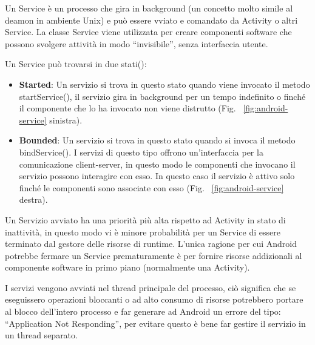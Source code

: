 Un Service è un processo che gira in background (un concetto molto simile al deamon in ambiente Unix) e può essere vviato e comandato da Activity o altri Service. La classe Service viene utilizzata per creare componenti software che possono svolgere attività in modo ``invisibile'', senza interfaccia utente.

Un Service può trovarsi in due stati(\cite{emanuele:android}):

\begin{itemize}
	\item \textbf{Started}: Un servizio si trova in questo stato quando viene invocato il metodo startService(), il servizio gira in background per un tempo indefinito o finché il componente che lo ha invocato non viene distrutto (Fig. ~\ref{fig:android-service} sinistra).
	\item \textbf{Bounded}: Un servizio si trova in questo stato quando si invoca il metodo bindService(). I servizi di questo tipo offrono un'interfaccia per la comunicazione client-server, in questo modo le componenti che invocano il servizio possono interagire con esso. In questo caso il servizio è attivo solo finché le componenti sono associate con esso (Fig. ~\ref{fig:android-service} destra).
\end{itemize}

\noindent
Un Servizio avviato ha una priorità più alta rispetto ad Activity in stato di inattività, in questo modo vi è minore probabilità per un Service di essere terminato dal gestore delle risorse di runtime. L’unica ragione per cui Android potrebbe fermare un Service prematuramente è per fornire risorse addizionali al componente software in primo piano (normalmente una Activity).

I servizi vengono avviati nel thread principale del processo, ciò significa che se eseguissero operazioni bloccanti o ad alto consumo di risorse potrebbero portare al blocco dell'intero processo e far generare ad Android un errore del tipo: ``Application Not Responding'', per evitare questo è bene far gestire il servizio in un thread separato.

